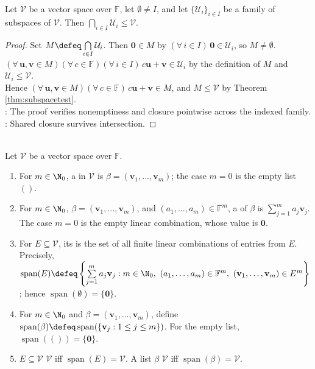 \begin{proposition} \label{prop:intersectionsubspaces} \\
Let $\mathcal{V}$ be a vector space over $\mathbb{F}$, let $\emptyset\neq I$, and let $\{\mathcal{U}_i\}_{i\in I}$ be a family of subspaces of $\mathcal{V}$. Then $\bigcap\limits_{i\in I}\mathcal{U}_i\leq\mathcal{V}$.
\begin{proof}
Set $M\defeq\bigcap\limits_{i\in I}\mathcal{U}_i$. Then $\mathbf{0}\in M$ by $(\forall\,i\in I)\,\mathbf{0}\in\mathcal{U}_i$, so $M\neq\emptyset$.\\
$(\forall\,\mathbf{u},\mathbf{v}\in M)(\forall\,c\in\mathbb{F})(\forall\,i\in I)\,c\mathbf{u}+\mathbf{v}\in\mathcal{U}_i$ by the definition of $M$ and $\mathcal{U}_i\leq\mathcal{V}$.\\
Hence $(\forall\,\mathbf{u},\mathbf{v}\in M)(\forall\,c\in\mathbb{F})\,c\mathbf{u}+\mathbf{v}\in M$, and $M\leq\mathcal{V}$ by Theorem \ref{thm:subspacetest}.\\
: The proof verifies nonemptiness and closure pointwise across the indexed family.\\
: Shared closure survives intersection.
\end{proof}
\end{proposition}

\begin{definition} \label{def:linear-combinations-and-span} \\
Let $\mathcal{V}$ be a vector space over $\mathbb{F}$.
\begin{enumerate}[label=(\roman*)]
\setlength{\itemsep}{0pt}
\item For $m\in\N_0$, a  in $\mathcal{V}$ is $\beta=(\mathbf{v}_1,\ldots,\mathbf{v}_m)$; the case $m=0$ is the empty list $()$.
\item For $m\in\N_0$, $\beta=(\mathbf{v}_1,\ldots,\mathbf{v}_m)$, and $(a_1,\ldots,a_m)\in\mathbb{F}^m$, a  of $\beta$ is $\sum\limits_{j=1}^{m}a_j\mathbf{v}_j$.\\
The case $m=0$ is the empty linear combination, whose value is $\mathbf{0}$.
\item For $E\subseteq\mathcal{V}$, its  is the set of all finite linear combinations of entries from $E$.\\
Precisely, $\operatorname{span}(E)\defeq\left\{\sum\limits_{j=1}^{m}a_j\mathbf{v}_j:m\in\N_0,\ (a_1,\ldots,a_m)\in\mathbb{F}^m,\ (\mathbf{v}_1,\ldots,\mathbf{v}_m)\in E^m\right\}$; hence $\operatorname{span}(\emptyset)=\{\mathbf{0}\}$.
\item For $m\in\N_0$ and $\beta=(\mathbf{v}_1,\ldots,\mathbf{v}_m)$, define $\operatorname{span}(\beta)\defeq\operatorname{span}(\{\mathbf{v}_j:1\leq j\leq m\})$. For the empty list, $\operatorname{span}(())=\{\mathbf{0}\}$.
\item $E\subseteq\mathcal{V}$  $\mathcal{V}$ iff $\operatorname{span}(E)=\mathcal{V}$. A list $\beta$  $\mathcal{V}$ iff $\operatorname{span}(\beta)=\mathcal{V}$.
\end{enumerate}
\end{definition}


